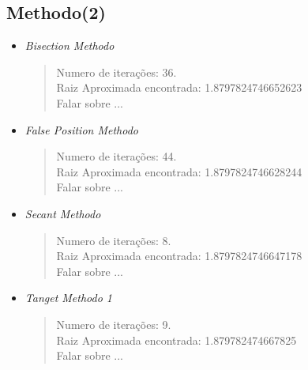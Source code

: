 \documentclass[12pt]{article}
\begin{document}
\subsection{Methodo(2)}
\begin{itemize}
    \item \textit{Bisection Methodo}\\
        \begin{verse}
          Numero de iterações: 36.\\
          Raiz Aproximada encontrada: 1.8797824746652623\\
          Falar sobre ...
        \end{verse}
    \item \textit{False Position Methodo}
        \begin{verse}
          Numero de iterações: 44.\\
          Raiz Aproximada encontrada: 1.8797824746628244\\
          Falar sobre ...
        \end{verse}
    \item \textit{Secant Methodo}
        \begin{verse}
          Numero de iterações: 8.\\
          Raiz Aproximada encontrada: 1.8797824746647178\\
          Falar sobre ...
        \end{verse}
    \item \textit{Tanget Methodo 1}
        \begin{verse}
          Numero de iterações: 9.\\
          Raiz Aproximada encontrada: 1.879782474667825\\
          Falar sobre ...
        \end{verse}
\end{itemize}
\end{document}
